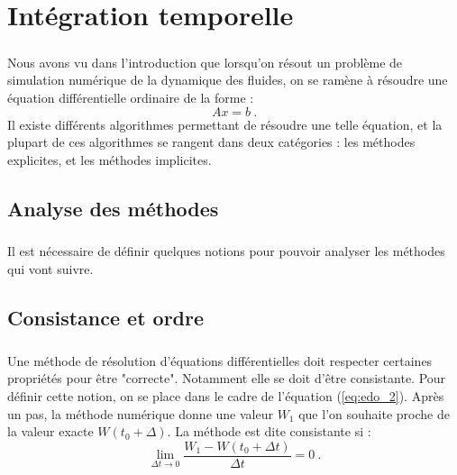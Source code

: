 \chapter{Intégration temporelle}

\paragraph{}
Nous avons vu dans l'introduction que lorsqu'on résout un problème de simulation numérique de la dynamique des fluides, on se ramène à résoudre une équation différentielle ordinaire de la forme :
\begin{equation}\label{eq:edo_2}
  Ax = b\ .
\end{equation}
Il existe différents algorithmes permettant de résoudre une telle équation, et la plupart de ces algorithmes se rangent dans deux catégories : les méthodes explicites, et les méthodes implicites.

\section{Analyse des méthodes}

  \paragraph{}
  Il est nécessaire de définir quelques notions pour pouvoir analyser les méthodes qui vont suivre.

  \section{Consistance et ordre}

    \paragraph{}
    Une méthode de résolution d'équations différentielles doit respecter certaines propriétés pour être "correcte".
    Notamment elle se doit d'être consistante.
    Pour définir cette notion, on se place dans le cadre de l'équation (\ref{eq:edo_2}).
    Après un pas, la méthode numérique donne une valeur $W_1$ que l'on souhaite proche de la valeur exacte $W\left(t_0 + \Delta\right)$.
    La méthode est dite consistante si :
    \[\lim_{\Delta t \rightarrow 0} \frac{W_1 - W\left(t_0 + \Delta t\right)}{\Delta t} = 0\ .\]

